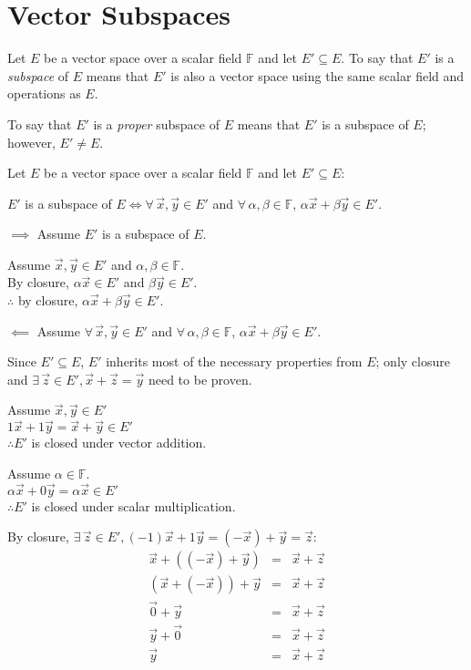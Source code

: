 \documentclass[letterpaper,12pt,fleqn]{article}
\newcommand{\F}{\mathbb{F}}
\renewcommand{\a}{\alpha}
\renewcommand{\b}{\beta}
\newcommand{\vx}{\vec{x}}
\newcommand{\vy}{\vec{y}}
\newcommand{\vz}{\vec{z}}
\newcommand{\vo}{\vec{0}}
\begin{document}
\section*{Vector Subspaces}

\begin{definition}
  Let $E$ be a vector space over a scalar field $\F$ and let $E'\subseteq E$. To
  say that $E'$ is a \emph{subspace} of $E$ means that $E'$ is also a vector
  space using the same scalar field and operations as $E$.

  To say that $E'$ is a \emph{proper} subspace of $E$ means that $E'$ is a
  subspace of $E$; however, $E'\ne E$.
\end{definition}

\begin{theorem}
  Let $E$ be a vector space over a scalar field $\F$ and let $E'\subseteq E$:

  $E'$ is a subspace of $E\iff\forall\,\vx,\vy\in E'$ and
  $\forall\,\a,\b\in\F$, $\a\vx+\b\vy\in E'$.
\end{theorem}

\begin{theproof}
  \listbreak
  \begin{description}
  \item $\implies$ Assume $E'$ is a subspace of $E$.

    Assume $\vx,\vy\in E'$ and $\a,\b\in\F$. \\
    By closure, $\a\vx\in E'$ and $\b\vy\in E'$. \\
    $\therefore$ by closure, $\a\vx+\b\vy\in E'$.

  \item $\impliedby$ Assume $\forall\,\vx,\vy\in E'$ and $\forall\,\a,\b\in\F$,
    $\a\vx+\b\vy\in E'$.

    Since $E'\subseteq E$, $E'$ inherits most of the necessary properties
    from $E$; only closure and $\exists\,\vz\in E',\vx+\vz=\vy$ need to be
    proven.

    Assume $\vx,\vy\in E'$ \\
    $1\vx+1\vy=\vx+\vy\in E'$ \\
    $\therefore E'$ is closed under vector addition.
    
    Assume $\a\in\F$. \\
    $\a\vx+0\vy=\a\vx\in E'$ \\
    $\therefore E'$ is closed under scalar multiplication.

    By closure, $\exists\,\vz\in E',(-1)\vx+1\vy=(-\vx)+\vy=\vz$:
    \begin{eqnarray*}
      \vx+((-\vx)+\vy) &=& \vx+\vz \\
      (\vx+(-\vx))+\vy &=& \vx+\vz \\
      \vo+\vy &=& \vx+\vz \\
      \vy+\vo &=& \vx+\vz \\
      \vy &=& \vx+\vz \\
    \end{eqnarray*}
  \end{description}
\end{theproof}
\end{document}
